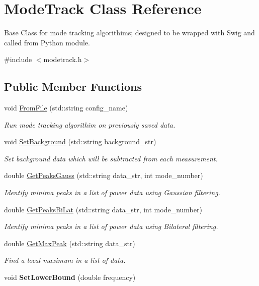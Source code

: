 \hypertarget{class_mode_track}{\section{Mode\-Track Class Reference}
\label{class_mode_track}
}


Base Class for mode tracking algorithims; designed to be wrapped with Swig and called from Python module.  




{\ttfamily \#include $<$modetrack.\-h$>$}

\subsection*{Public Member Functions}
\begin{DoxyCompactItemize}
\item 
void \hyperlink{class_mode_track_a53130b8d183a69b14d2ef47666d09385}{From\-File} (std\-::string config\-\_\-name)
\begin{DoxyCompactList}\small\item\em Run mode tracking algorithim on previously saved data. \end{DoxyCompactList}\item 
void \hyperlink{class_mode_track_aa04491a2f3b4bb04fe6503757d416b73}{Set\-Background} (std\-::string background\-\_\-str)
\begin{DoxyCompactList}\small\item\em Set background data which will be subtracted from each measurement. \end{DoxyCompactList}\item 
double \hyperlink{class_mode_track_ac4ab8caa7ab71906390651cdd4c20c0c}{Get\-Peaks\-Gauss} (std\-::string data\-\_\-str, int mode\-\_\-number)
\begin{DoxyCompactList}\small\item\em Identify minima peaks in a list of power data using Gaussian filtering. \end{DoxyCompactList}\item 
double \hyperlink{class_mode_track_a2158f2117f99a3aee6891bcc2126aa83}{Get\-Peaks\-Bi\-Lat} (std\-::string data\-\_\-str, int mode\-\_\-number)
\begin{DoxyCompactList}\small\item\em Identify minima peaks in a list of power data using Bilateral filtering. \end{DoxyCompactList}\item 
double \hyperlink{class_mode_track_a8ffe12b39a5d90b6ba7a25c0c66bea8d}{Get\-Max\-Peak} (std\-::string data\-\_\-str)
\begin{DoxyCompactList}\small\item\em Find a local maximum in a list of data. \end{DoxyCompactList}\item 
\hypertarget{class_mode_track_a99eeeb6757873474994a61dbd7e31e43}{void {\bfseries Set\-Lower\-Bound} (double frequency)}\label{class_mode_track_a99eeeb6757873474994a61dbd7e31e43}


\end{DoxyCompactItemize}
